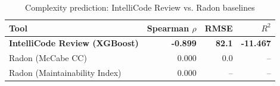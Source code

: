 \begin{table}[H]
\centering
\caption{Complexity prediction: IntelliCode Review vs. Radon baselines}
\label{tab:market-complexity}
\begin{tabular}{@{}lrrr@{}}
\toprule
\textbf{Tool} & \textbf{Spearman $\rho$} & \textbf{RMSE} & \textbf{$R^2$} \\
\midrule
\textbf{IntelliCode Review (XGBoost)} & \textbf{-0.899} & \textbf{82.1} & \textbf{-11.467} \\
Radon (McCabe CC) & 0.000 & 0.0 & -- \\
Radon (Maintainability Index) & 0.000 & -- & -- \\
\bottomrule
\end{tabular}
\end{table}
